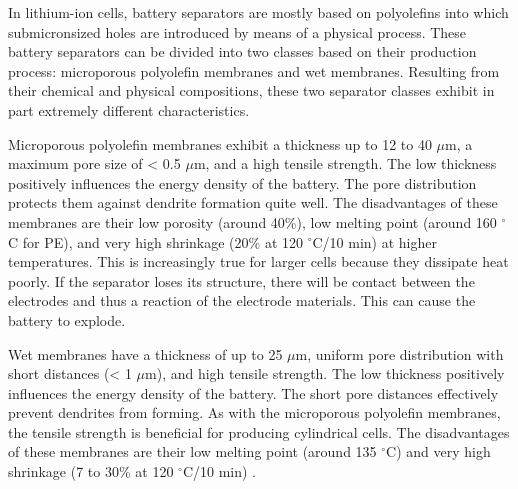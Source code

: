 In lithium-ion cells, battery separators are mostly based on polyolefins into which submicronsized holes are introduced by means of a physical process. These battery separators can be divided into two classes based on their production process: microporous polyolefin membranes and wet membranes.
Resulting from their chemical and physical compositions, these two separator classes exhibit in part extremely different characteristics.

Microporous polyolefin membranes exhibit a thickness up to 12 to 40 $\mu$m, a maximum pore size of < 0.5 $\mu$m, and a high tensile strength. The low thickness positively influences the energy density of the battery. The pore distribution protects them against dendrite formation quite well. The disadvantages of these membranes are their low porosity (around 40\%), low melting point (around 160 $^\circ$C for PE), and very high shrinkage (20\% at 120 $^\circ$C/10 min) at higher temperatures. This is increasingly true for larger cells because they dissipate heat poorly. If the separator loses its structure, there will be contact between the electrodes and thus a reaction of the electrode materials. This can cause the battery to explode.

Wet membranes have a thickness of up to 25 $\mu$m, uniform pore distribution with short distances (< 1 $\mu$m), and high tensile strength. The low thickness positively influences the energy density of the battery. The short pore distances effectively prevent dendrites from forming. As with the microporous polyolefin membranes, the tensile strength is beneficial for producing cylindrical cells. The disadvantages of these membranes are their low melting point (around 135 $^\circ$C) and very high shrinkage (7 to 30\% at 120 $^\circ$C/10 min) \cite{arora2004battery,bladwin2009review}.

